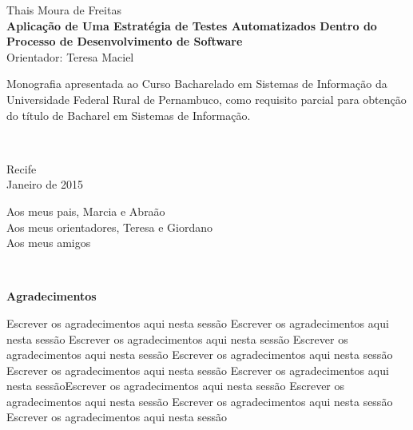 %
\hyphenation{}

\vspace*{0.0cm}
{\center
{\Large Thais Moura de Freitas}\\[2.4cm]
{\huge \bf Aplicação de Uma Estratégia de Testes Automatizados Dentro do Processo de Desenvolvimento de Software}\\[2.0cm]
{\Large Orientador: Teresa Maciel}}\\[2.0cm]

{\raggedleft
\begin{minipage}[t]{8.3cm}
\setlength{\baselineskip}{0.25in}
Monografia apresentada ao Curso Bacharelado em Sistemas de Informação  da Universidade Federal Rural de Pernambuco, como requisito parcial para obtenção do título de Bacharel em Sistemas de Informação.\end{minipage}\\[2cm]}
\vspace{3cm}
{\center Recife \\[3mm]
Janeiro de 2015 \\}

\newpage
\vspace*{18cm}
{\raggedleft
\begin{minipage}[t]{6.0cm}
\setlength{\baselineskip}{0.25in}
Aos meus pais, Marcia e Abraão\\
Aos meus orientadores, Teresa e Giordano\\
Aos meus amigos\\
\end{minipage}\\[2cm]}



\newpage
\begin{center}
{\Large \bf Agradecimentos}
\end{center}
\vspace*{-0.06in}

Escrever os agradecimentos aqui nesta sessão
Escrever os agradecimentos aqui nesta sessão
Escrever os agradecimentos aqui nesta sessão
Escrever os agradecimentos aqui nesta sessão
Escrever os agradecimentos aqui nesta sessão
Escrever os agradecimentos aqui nesta sessão
Escrever os agradecimentos aqui nesta sessãoEscrever os agradecimentos aqui nesta sessão
Escrever os agradecimentos aqui nesta sessão
Escrever os agradecimentos aqui nesta sessão
Escrever os agradecimentos aqui nesta sessão

